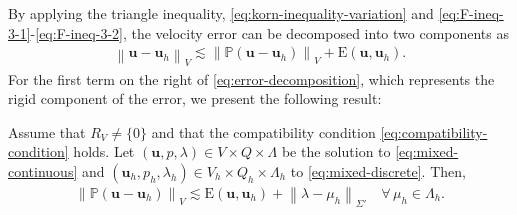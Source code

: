 \documentclass[onefignum,onetabnum]{siamart190516}
\newcommand{\bu}{\boldsymbol{u}}
\newcommand{\bE}{\mathrm{E}}
\newcommand{\bbP}{\mathbb{P}}
\newcommand{\nrm}[1]{\left\lVert#1\right\rVert}
\begin{document}
By applying the triangle inequality, \eqref{eq:korn-inequality-variation} and \eqref{eq:F-ineq-3-1}-\eqref{eq:F-ineq-3-2}, the velocity error can be decomposed into two components as
%
\begin{align}\label{eq:error-decomposition}
	\nrm{\bu - \bu_h}_V \lesssim \nrm{\bbP(\bu - \bu_h)}_V + \bE(\bu,\bu_h).
\end{align}
%
For the first term on the right of \eqref{eq:error-decomposition}, which represents the rigid component of the error, we present the following result:

\begin{lemma}\label{lemma:error-estimates-rigid-error}
	Assume that $R_V \neq \{0\}$ and that the compatibility condition \eqref{eq:compatibility-condition} holds. Let $(\bu,p,\lambda)\in V\times Q\times \Lambda$ be the solution to \eqref{eq:mixed-continuous} and $(\bu_h,p_h,\lambda_h)\in V_h\times Q_h\times \Lambda_h$ to \eqref{eq:mixed-discrete}. Then,
	\begin{align}\label{eq:error-vel-rigid}
		\nrm{\bbP(\bu - \bu_h)}_V \lesssim \bE(\bu,\bu_h) + \nrm{\lambda -\mu_h}_{\Sigma'} \quad \forall\,\mu_h\in \Lambda_h.
	\end{align}
\end{lemma}
\end{document}
